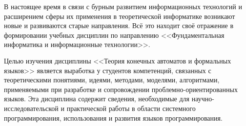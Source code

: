 \large

\label{Intro}
В настоящее время в связи с бурным развитием информационных технологий и расширением сферы их применения в теоретической информатике возникают новые и развиваются старые направления. Всё это находит своё отражение в формировании учебных дисциплин по направлению <<Фундаментальная информатика и информационные технологии>>. 

Целью изучения дисциплины <<Теория конечных автоматов и формальных языков>> является выработка у студентов компетенций, связанных с теоретическими понятиями, идеями, методами, моделями, алгоритмами, применяемыми при разработке и сопровождении проблемно-ориентированных языков. Эта дисциплина содержит сведения, необходимые для научно-исследовательской и практической работы в области системного программирования, использования и развития языков программирования.

